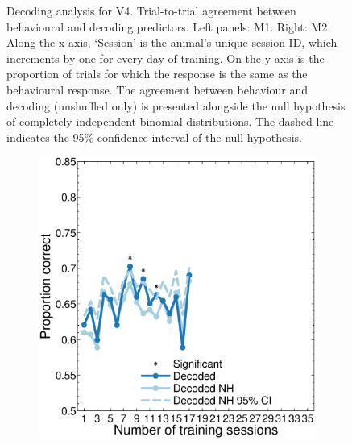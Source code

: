 \begin{figure}[htbp]
\begin{subfigure}[b]{0.5\linewidth}
    \end{subfigure}
    \caption{%
    Decoding analysis for \ac{V4}.
    Trial-to-trial agreement between behavioural and decoding predictors.
    Left panels: \ac{M1}. Right: \ac{M2}.
	Along the x-axis, `Session' is the animal's unique session ID, which increments by one for every day of training.
    On the y-axis is the proportion of trials for which the response is the same as the behavioural response.
    The agreement between behaviour and decoding (unshuffled only) is presented alongside the null hypothesis of completely independent binomial distributions.
    The dashed line indicates the 95\% confidence interval of the null hypothesis.
}
    \label{fig:decag_all_v4}
\end{figure}

\begin{figure}[htbp]
    \begin{subfigure}[b]{0.5\linewidth}
        \centering
        \caption{}
        \label{fig:decag_b1_allp}
	\includegraphics[width=\linewidth]{figs/decoding/agree_v1_blanco.eps}
    \end{subfigure}
    ~~
    \begin{subfigure}[b]{0.5\linewidth}
        \centering
        \caption{}
        \label{fig:decag_j1_allp}

\end{subfigure}
\end{figure}
